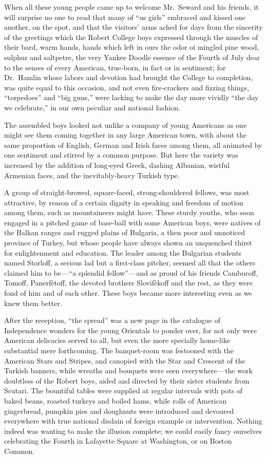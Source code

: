 \documentclass[12pt]{book}
\begin{document}
When all these young people came up to welcome Mr.~Seward and his friends,
it will surprise no one to read that many of “us girls” embraced and kissed one
another, on the spot, and that the visitors’ arms ached for days from the sincerity
of the greetings which the Robert College boys expressed through the muscles
of their bard, warm hands, hands which left in ours the odor oi mingled pine
wood, sulphur and saltpetre, the very Yankee Doodle essence of the Fourth of
July dear to the senses of every American, true‐born, in fact or in sentiment; for
Dr.~Hamlin whose labors and devotion had brought the College to completion,
was quite equal to this occasion, and not even fire‐crackers and fizzing things,
“torpedoes” and “big guns,” were lacking to make the day more vividly “the day
we celebrate,” in our own peculiar and national fashion.

The assembled boys looked not unlike a company of young Americans as one
might see them coming together in any large American town, with about the same
proportion of English, German and Irish faces among them, all animated by one
sentiment and stirred by a common purpose. But here the variety was increased
by the addition of long‐eyed Greek, dashing Albanian, wistful Armenian faces,
and the inevitably‐heavy Turkish type.

A group of straight‐browed, square‐faced, strong‐shouldered fellows, was
most attractive, by reason of a certain dignity in speaking and freedom of motion
among them, such as mountaineers might have. These sturdy youths, who soon
engaged in a pitched game of base‐ball with some American boys, were natives
of the Balkan ranges and rugged plains of Bulgaria, a then poor and unnoticed
province of Turkey, but whose people have always shown an unquenched thirst
for enlightenment and education. The leader among the Bulgarian students named
Storloff, a serious lad but a first‐class pitcher, seemed all that the others claimed
him to be — “a splendid fellow” — and as proud of his friends Camburoff, Tomoff,
Panerfètoff, the devoted brothers Slovifèkoff and the rest, as they were fond of
him and of each other. These boys became more interesting even as we knew
them better.

After the reception, “the spread” was a new page in the catalogue of Independence wonders for the young Orientals to ponder over, for not only were
American delicacies served to all, but even the more specially home‐like substantial mere forthcoming. The banquet‐room was festooned with the American Stars
and Stripes, and canopied with the Star and Crescent of the Turkish banners,
while wreaths and bouquets were seen everywhere — the work doubtless of the
Robert boys, aided and directed by their sister students from Scutari. The bountiful tables were supplied at regular intervals with pots of baked beans, roasted
turkeys and boiled hams, while rolls of American gingerbread, pumpkin pies
and doughnuts were introduced and devoured everywhere with true national
disdain of foreign example or intervention. Nothing indeed was wanting to make
the illusion complete; we could easily fancy ourselves celebrating the Fourth in
Lafayette Square at Washington, or on Boston Common.
\end{document}
